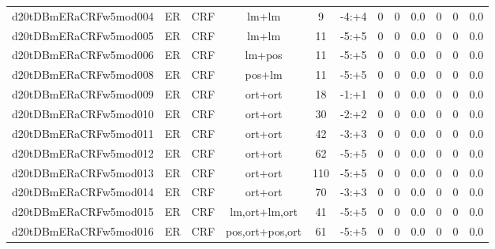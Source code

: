 \documentclass[a4paper]{article}
\begin{document}
\begin{landscape}
\begin{center}
\begin{tabular}{ |c|c|c|c|c|c|c|c|c|c|c|c|}
 
 	
 	\small{ d20tDBmERaCRFw5mod004 } & ER & CRF & lm+lm  &  9 &  -4:+4  &  0 & 0 & 0.0  &  0 & 0 & 0.0 \\
 	

 
 	
 	\small{ d20tDBmERaCRFw5mod005 } & ER & CRF & lm+lm  &  11 &  -5:+5  &  0 & 0 & 0.0  &  0 & 0 & 0.0 \\
 	

 
 	
 	\small{ d20tDBmERaCRFw5mod006 } & ER & CRF & lm+pos  &  11 &  -5:+5  &  0 & 0 & 0.0  &  0 & 0 & 0.0 \\
 	

 
 	
 	\small{ d20tDBmERaCRFw5mod008 } & ER & CRF & pos+lm  &  11 &  -5:+5  &  0 & 0 & 0.0  &  0 & 0 & 0.0 \\
 	

 
 	
 	\small{ d20tDBmERaCRFw5mod009 } & ER & CRF & ort+ort  &  18 &  -1:+1  &  0 & 0 & 0.0  &  0 & 0 & 0.0 \\
 	

 
 	
 	\small{ d20tDBmERaCRFw5mod010 } & ER & CRF & ort+ort  &  30 &  -2:+2  &  0 & 0 & 0.0  &  0 & 0 & 0.0 \\
 	

 
 	
 	\small{ d20tDBmERaCRFw5mod011 } & ER & CRF & ort+ort  &  42 &  -3:+3  &  0 & 0 & 0.0  &  0 & 0 & 0.0 \\
 	

 
 	
 	\small{ d20tDBmERaCRFw5mod012 } & ER & CRF & ort+ort  &  62 &  -5:+5  &  0 & 0 & 0.0  &  0 & 0 & 0.0 \\
 	

 
 	
 	\small{ d20tDBmERaCRFw5mod013 } & ER & CRF & ort+ort  &  110 &  -5:+5  &  0 & 0 & 0.0  &  0 & 0 & 0.0 \\
 	

 
 	
 	\small{ d20tDBmERaCRFw5mod014 } & ER & CRF & ort+ort  &  70 &  -3:+3  &  0 & 0 & 0.0  &  0 & 0 & 0.0 \\
 	

 
 	
 	\small{ d20tDBmERaCRFw5mod015 } & ER & CRF & lm,ort+lm,ort  &  41 &  -5:+5  &  0 & 0 & 0.0  &  0 & 0 & 0.0 \\
 	

 
 	
 	\small{ d20tDBmERaCRFw5mod016 } & ER & CRF & pos,ort+pos,ort  &  61 &  -5:+5  &  0 & 0 & 0.0  &  0 & 0 & 0.0 \\
 	


\end{tabular}
\end{center}
\end{landscape}
\end{document}
